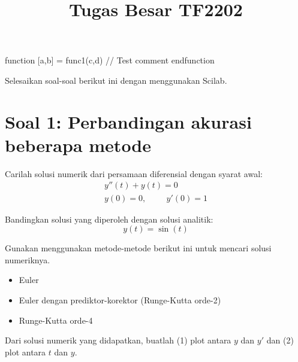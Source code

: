 \documentclass[12pt]{article}
\begin{document}
\title{Tugas Besar TF2202}
\date{}
\maketitle

\begin{scilabcode}
function [a,b] = func1(c,d)
  // Test comment
endfunction
\end{scilabcode}

Selesaikan soal-soal berikut ini dengan menggunakan Scilab.

\section{Soal 1: Perbandingan akurasi beberapa metode}

Carilah solusi numerik dari persamaan diferensial dengan syarat awal:
\begin{align}
y''(t) + y(t) = 0 \\
y(0) = 0, \hspace{1cm} y'(0) = 1
\end{align}

Bandingkan solusi yang diperoleh dengan solusi analitik:
\begin{equation}
y(t) = \sin(t)
\end{equation}

Gunakan menggunakan metode-metode berikut ini untuk mencari solusi numeriknya.
\begin{itemize}
\item Euler
\item Euler dengan prediktor-korektor (Runge-Kutta orde-2)
\item Runge-Kutta orde-4
\end{itemize}

Dari solusi numerik yang didapatkan, buatlah (1) plot antara $y$ dan $y'$
dan (2) plot antara $t$ dan $y$.










\end{document}
